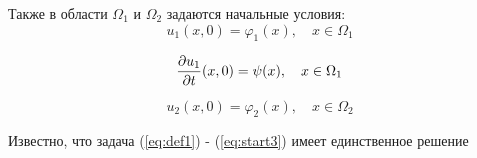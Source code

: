 Также в области $\Omega_1$ и $\Omega_2$ задаются начальные условия:
\begin{equation}
     u_1(x, 0) = \varphi_1(x), \quad x \in \Omega_1 
     \label{eq:start1}
\end{equation}

\begin{equation}
     {\frac{\partial u_1}{\partial t}}(x, 0) = \psi(x), \quad x \in \Omega_1 
     \label{eq:start2}
\end{equation}

\begin{equation}
     u_2(x, 0) = \varphi_2(x), \quad x \in \Omega_2
     \label{eq:start3}
\end{equation}


Известно, что задача (\ref{eq:def1}) -  (\ref{eq:start3}) имеет единственное решение 
